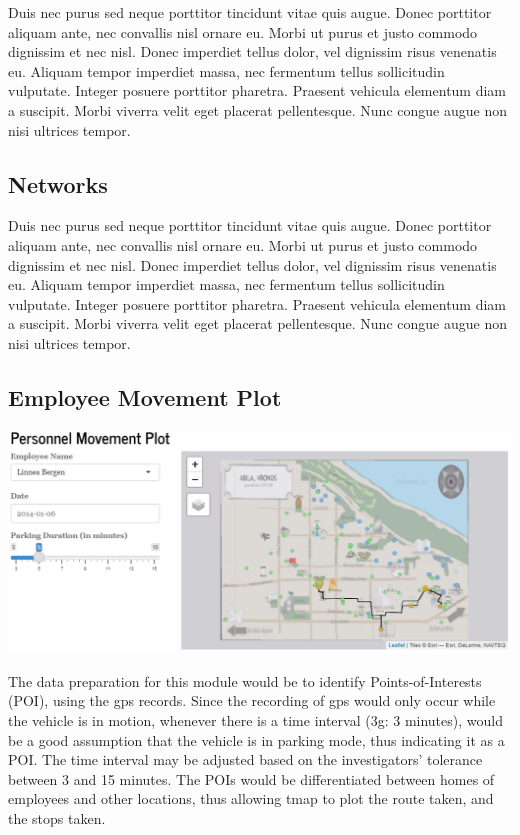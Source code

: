 \documentclass{acm_proc_article-sp}
\begin{document}
Duis nec purus sed neque porttitor tincidunt vitae quis augue. Donec
porttitor aliquam ante, nec convallis nisl ornare eu. Morbi ut purus et
justo commodo dignissim et nec nisl. Donec imperdiet tellus dolor, vel
dignissim risus venenatis eu. Aliquam tempor imperdiet massa, nec
fermentum tellus sollicitudin vulputate. Integer posuere porttitor
pharetra. Praesent vehicula elementum diam a suscipit. Morbi viverra
velit eget placerat pellentesque. Nunc congue augue non nisi ultrices
tempor.

\hypertarget{networks}{%
\subsection{Networks}\label{networks}}

Duis nec purus sed neque porttitor tincidunt vitae quis augue. Donec
porttitor aliquam ante, nec convallis nisl ornare eu. Morbi ut purus et
justo commodo dignissim et nec nisl. Donec imperdiet tellus dolor, vel
dignissim risus venenatis eu. Aliquam tempor imperdiet massa, nec
fermentum tellus sollicitudin vulputate. Integer posuere porttitor
pharetra. Praesent vehicula elementum diam a suscipit. Morbi viverra
velit eget placerat pellentesque. Nunc congue augue non nisi ultrices
tempor.

\hypertarget{employee-movement-plot}{%
\subsection{Employee Movement Plot}\label{employee-movement-plot}}

\includegraphics{img/Movement.PNG}

The data preparation for this module would be to identify
Points-of-Interests (POI), using the gps records. Since the recording of
gps would only occur while the vehicle is in motion, whenever there is a
time interval (3g: 3 minutes), would be a good assumption that the
vehicle is in parking mode, thus indicating it as a POI. The time
interval may be adjusted based on the investigators' tolerance between 3
and 15 minutes. The POIs would be differentiated between homes of
employees and other locations, thus allowing tmap to plot the route
taken, and the stops taken.
\end{document}
